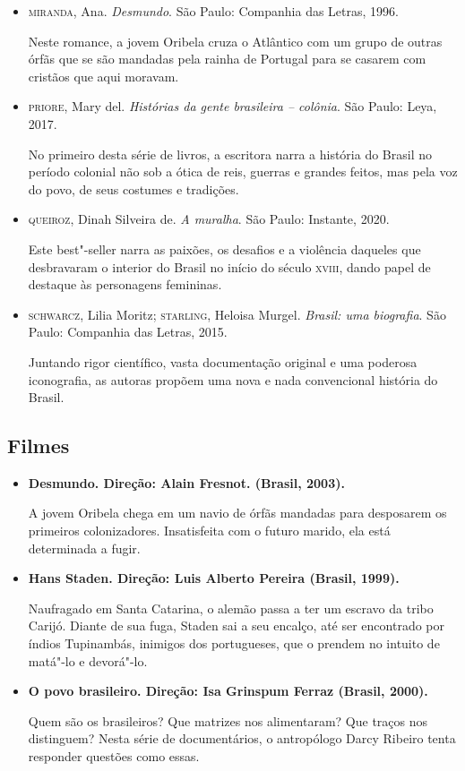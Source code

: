 \documentclass[12pt]{extarticle}
\begin{document}
\begin{itemize}
\item\textsc{miranda}, Ana. \textit{Desmundo}. São Paulo: Companhia das Letras, 1996.

Neste romance, a jovem Oribela cruza o Atlântico com um grupo de outras
órfãs que se são mandadas pela rainha de Portugal para se casarem com
cristãos que aqui moravam.

\item\textsc{priore}, Mary del. \textit{Histórias da gente brasileira -- colônia}. São Paulo: Leya, 2017.

No primeiro desta série de livros, a escritora narra a história do
Brasil no período colonial não sob a ótica de reis, guerras e grandes
feitos, mas pela voz do povo, de seus costumes e tradições.

\item\textsc{queiroz}, Dinah Silveira de. \textit{A muralha}. São Paulo: Instante,
2020.

Este best"-seller narra as paixões, os desafios e a violência daqueles
que desbravaram o interior do Brasil no início do século \textsc{xviii}, dando
papel de destaque às personagens femininas.

\item\textsc{schwarcz}, Lilia Moritz; \textsc{starling}, Heloisa Murgel. \textit{Brasil: uma biografia}. São Paulo: Companhia das Letras, 2015.

Juntando rigor científico, vasta documentação original e uma poderosa
iconografia, as autoras propõem uma nova e nada convencional história do
Brasil.
\end{itemize}

\subsection{Filmes}

\begin{itemize}
\item\textbf{Desmundo. Direção: Alain Fresnot. (Brasil, 2003).}

A jovem Oribela chega em um navio de órfãs mandadas para desposarem os
primeiros colonizadores. Insatisfeita com o futuro marido, ela está
determinada a fugir.

\item\textbf{Hans Staden. Direção: Luis Alberto Pereira (Brasil, 1999). }

Naufragado em Santa Catarina, o alemão passa a ter um escravo da tribo
Carijó. Diante de sua fuga, Staden sai a seu encalço, até ser encontrado
por índios Tupinambás, inimigos dos portugueses, que o prendem no
intuito de matá"-lo e devorá"-lo.

\item\textbf{O povo brasileiro. Direção: Isa Grinspum Ferraz (Brasil, 2000).}

Quem são os brasileiros? Que matrizes nos alimentaram? Que traços nos
distinguem? Nesta série de documentários, o antropólogo Darcy Ribeiro
tenta responder questões como essas.
\end{itemize}
\end{document}
